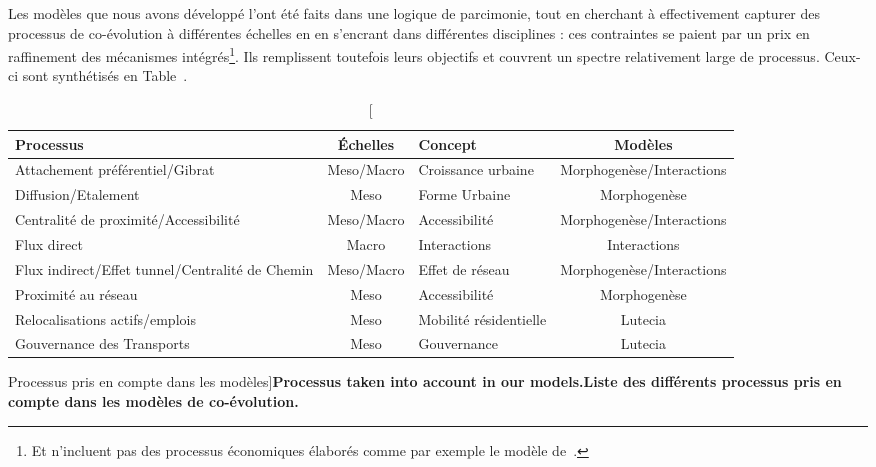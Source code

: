Les modèles que nous avons développé l'ont été faits dans une logique de parcimonie, tout en cherchant à effectivement capturer des processus de co-évolution à différentes échelles en en s'encrant dans différentes disciplines : ces contraintes se paient par un prix en raffinement des mécanismes intégrés\footnote{Et n'incluent pas des processus économiques élaborés comme par exemple le modèle de~\cite{levinson2007co}.}. Ils remplissent toutefois leurs objectifs et couvrent un spectre relativement large de processus. Ceux-ci sont synthétisés en Table~\label{tab:partIII:modeled}. 


\begin{table}
\begin{tabular}[6pt]{|p{4cm}|c|p{4cm}|c|}
\hline
Processus & Échelles & Concept & Modèles \\\hline
Attachement préférentiel/Gibrat  & Meso/Macro & Croissance urbaine & Morphogenèse/Interactions \\\hline
Diffusion/Etalement & Meso & Forme Urbaine & Morphogenèse \\\hline
Centralité de proximité/Accessibilité & Meso/Macro & Accessibilité & Morphogenèse/Interactions \\\hline
Flux direct & Macro & Interactions & Interactions\\\hline
Flux indirect/Effet tunnel/Centralité de Chemin & Meso/Macro & Effet de réseau & Morphogenèse/Interactions \\\hline
Proximité au réseau & Meso & Accessibilité & Morphogenèse \\\hline
Relocalisations actifs/emplois & Meso & Mobilité résidentielle & Lutecia\\\hline
Gouvernance des Transports & Meso & Gouvernance & Lutecia\\\hline
\end{tabular}
\caption[Processus taken into account in our models][Processus pris en compte dans les modèles]{\textbf{Processus taken into account in our models.}\label{tab:partIII:modeled}}{\textbf{Liste des différents processus pris en compte dans les modèles de co-évolution.}\label{tab:partIII:modeled}}
\end{table}






